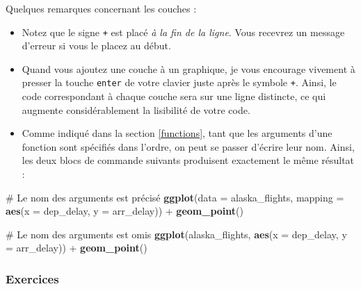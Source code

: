 \documentclass[a4paperpaper,]{article}
\newenvironment{Shaded}{\begin{snugshade}}{\end{snugshade}}
\newcommand{\CommentTok}[1]{\textcolor[rgb]{0.54,0.53,0.53}{#1}}
\newcommand{\DataTypeTok}[1]{\textcolor[rgb]{0.00,0.34,0.68}{#1}}
\newcommand{\KeywordTok}[1]{\textcolor[rgb]{0.12,0.11,0.11}{\textbf{#1}}}
\newcommand{\NormalTok}[1]{\textcolor[rgb]{0.12,0.11,0.11}{#1}}
\newcommand{\OperatorTok}[1]{\textcolor[rgb]{0.12,0.11,0.11}{#1}}
\newcommand{\StringTok}[1]{\textcolor[rgb]{0.75,0.01,0.01}{#1}}
\providecommand{\tightlist}{%
  \setlength{\itemsep}{0pt}\setlength{\parskip}{0pt}}
\begin{document}
Quelques remarques concernant les couches :

\begin{itemize}
\tightlist
\item
  Notez que le signe \texttt{+} est placé \emph{à la fin de la ligne}. Vous recevrez un message d'erreur si vous le placez au début.
\item
  Quand vous ajoutez une couche à un graphique, je vous encourage vivement à presser la touche \texttt{enter} de votre clavier juste après le symbole \texttt{+}. Ainsi, le code correspondant à chaque couche sera sur une ligne distincte, ce qui augmente considérablement la lisibilité de votre code.
\item
  Comme indiqué dans la section \ref{functions}, tant que les arguments d'une fonction sont spécifiés dans l'ordre, on peut se passer d'écrire leur nom. Ainsi, les deux blocs de commande suivants produisent exactement le même résultat :
\end{itemize}

\begin{Shaded}
\begin{Highlighting}[]
\CommentTok{# Le nom des arguments est précisé}
\KeywordTok{ggplot}\NormalTok{(}\DataTypeTok{data =}\NormalTok{ alaska_flights, }\DataTypeTok{mapping =} \KeywordTok{aes}\NormalTok{(}\DataTypeTok{x =}\NormalTok{ dep_delay, }\DataTypeTok{y =}\NormalTok{ arr_delay)) }\OperatorTok{+}\StringTok{ }
\StringTok{  }\KeywordTok{geom_point}\NormalTok{()}

\CommentTok{# Le nom des arguments est omis}
\KeywordTok{ggplot}\NormalTok{(alaska_flights, }\KeywordTok{aes}\NormalTok{(}\DataTypeTok{x =}\NormalTok{ dep_delay, }\DataTypeTok{y =}\NormalTok{ arr_delay)) }\OperatorTok{+}\StringTok{ }
\StringTok{  }\KeywordTok{geom_point}\NormalTok{()}
\end{Highlighting}
\end{Shaded}

\hypertarget{exercices-2}{%
\subsubsection{Exercices}\label{exercices-2}}
\end{document}
